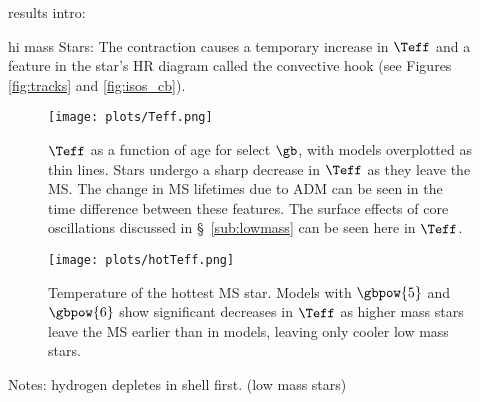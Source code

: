 results intro:


hi mass Stars:
The contraction causes a temporary increase in $\Teff$ and a feature in the star's HR diagram called the convective hook (see Figures \ref{fig:tracks} and \ref{fig:isos_cb}).

\begin{figure*}
  \centering
  \texttt{[image: plots/Teff.png]}
  \caption{$\Teff$ as a function of age for select $\gb$, with \nodm models overplotted as thin lines. Stars undergo a sharp decrease in $\Teff$ as they leave the MS. The change in MS lifetimes due to ADM can be seen in the time difference between these features. The surface effects of core oscillations discussed in \S~\ref{sub:lowmass} can be seen here in $\Teff$.
  }
  \label{fig:Teff}
\end{figure*}



\begin{figure*}
  \centering
  \texttt{[image: plots/hotTeff.png]}
  \caption{
  Temperature of the hottest MS star. Models with $\gbpow{5}$ and $\gbpow{6}$ show significant decreases in $\Teff$ as higher mass stars leave the MS earlier than in \nodm models, leaving only cooler low mass stars.
  }
  \label{fig:hotTeff}

\end{figure*}




Notes:
hydrogen depletes in shell first. (low mass stars)
